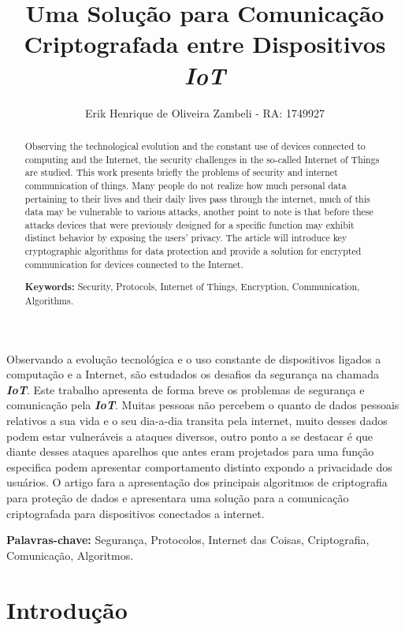 \documentclass[12pt]{article}
\title{Uma Solução para Comunicação Criptografada entre Dispositivos \textbf{\textit{IoT}}}
\author{Erik Henrique de Oliveira Zambeli - RA: 1749927}
\begin{document}
 

\maketitle

\begin{abstract}
 Observing the technological evolution and the constant use of devices connected to computing and the Internet, the security challenges in the so-called Internet of Things are studied. This work presents briefly the problems of security and internet communication of things. Many people do not realize how much personal data pertaining to their lives and their daily lives pass through the internet, much of this data may be vulnerable to various attacks, another point to note is that before these attacks devices that were previously designed for a specific function may exhibit distinct behavior by exposing the users' privacy. The article will introduce key cryptographic algorithms for data protection and provide a solution for encrypted communication for devices connected to the Internet.



\textbf{Keywords:} Security, Protocols, Internet of Things, Encryption, Communication, Algorithms.
\end{abstract}
     
\begin{resumo} 
  Observando a evolução tecnológica e o uso constante de dispositivos ligados a computação e a Internet, são estudados os desafios da segurança na chamada \textbf{\textit{IoT}}. Este trabalho apresenta de forma breve os problemas de segurança e comunicação pela \textbf{\textit{IoT}}. Muitas pessoas não percebem o quanto de dados pessoais relativos a sua vida e o seu dia-a-dia transita pela internet, muito desses dados podem estar vulneráveis a ataques diversos, outro ponto a se destacar é que diante desses ataques aparelhos que antes eram projetados para uma função especifica podem apresentar comportamento distinto expondo a privacidade dos usuários. O artigo fara a apresentação dos principais algoritmos de criptografia para proteção de dados e apresentara uma solução para a comunicação criptografada para dispositivos conectados a internet.  


\textbf{Palavras-chave:} Segurança, Protocolos, Internet das Coisas, Criptografia, Comunicação, Algoritmos.  

\end{resumo}


\section{Introdução}
\end{document}
